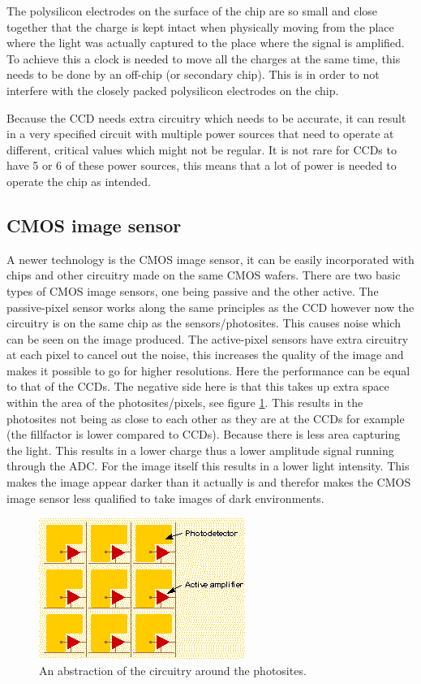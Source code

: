 \documentclass{article}
\begin{document}
The polysilicon electrodes on the surface of the chip are so small and close together that the charge is kept intact when physically moving from the place where the light was actually captured to the place where the signal is amplified. To achieve this a clock is needed to move all the charges at the same time, this needs to be done by an off-chip (or secondary chip). This is in order to not interfere with the closely packed polysilicon electrodes on the chip. 

Because the CCD needs extra circuitry which needs to be accurate, it can result in a very specified circuit with multiple power sources that need to operate at different, critical values which might not be regular. It is not rare for CCDs to have 5 or 6 of these power sources, this means that a lot of power is needed to operate the chip as intended.


\subsection{CMOS image sensor}

A newer technology is the CMOS image sensor, it can be easily incorporated with chips and other circuitry made on the same CMOS wafers. There are two basic types of CMOS image sensors, one being passive and the other active. The passive-pixel sensor works along the same principles as the CCD however now the circuitry is on the same chip as the sensors/photosites. This causes noise which can be seen on the image produced. The active-pixel sensors have extra circuitry at each pixel to cancel out the noise, this increases the quality of the image and makes it possible to go for higher resolutions. Here the performance can be equal to that of the CCDs. The negative side here is that this takes up extra space within the area of the photosites/pixels, see figure \ref{cmos1}. This results in the photosites not being as close to each other as they are at the CCDs for example (the fillfactor is lower compared to CCDs). Because there is less area capturing the light. This results in a lower charge thus a lower amplitude signal running through the ADC. For the image itself this results in a lower light intensity. This makes the image appear darker than it actually is and therefor makes the CMOS image sensor  less qualified to take images of dark environments.

\begin{figure}[H]
	\centering
	\includegraphics[scale=1]{figures/fillfactor}
	\caption{An abstraction of the circuitry around the photosites. }
	\label{cmos1}
\end{figure}
\end{document}
